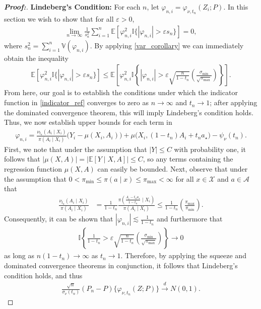 \documentclass[11pt,twoside]{article}
\theoremstyle{definition}
\theoremstyle{remark}
\begin{document}
\begin{proof}[\textbf{Proof:}]
\textbf{Lindeberg's Condition:} For each $n$, let $\varphi_{n,i} = \varphi_{\nu,t_n}(Z_i;P)$. In this section we wish to show that for all $\varepsilon > 0$,
    \begin{align*}
        \lim_{n\to\infty}\frac{1}{s_n^2}\sum_{i=1}^n\mathbb{E}\left[
        \varphi^2_{n, i}  \mathbb{I}\{|\varphi_{n, i}|>\varepsilon s_n\}
        \right] = 0,
    \end{align*}
where $s^2_n = \sum^n_{i=1} \mathbb{V}(\varphi_{n, i})$. By applying \cref{var_corollary} we can immediately obtain the inequality
\begin{align} \label{indicator_ref}
    \mathbb{E}\left[
    \varphi^2_{n, i} \mathbb{I}\{|\varphi_{n, i}|>\varepsilon s_n\}
    \right] \leq \mathbb{E}\left[
    \varphi^2_{n, i} \mathbb{I}\left\{ |\varphi_{n, i}|> \varepsilon \sqrt{\frac{n}{1 - t_n}}\left(\frac{\sigma_{\text{min}}}{\sqrt{\pi_{\max}}}\right)\right\} 
    \right].
\end{align}
From here, our goal is to establish the conditions under which the indicator function in \cref{indicator_ref} converges to zero as $n \to \infty$ and $t_n \to 1$; after applying the dominated convergence theorem, this will imply Lindeberg's condition holds. Thus, we now establish upper bounds for each term in
\begin{align*}
    \varphi_{n, i} =  \frac{\nu_{t_n}(A_i \mid X_i)}{\pi(A_i \mid X_i)}\big(Y_i - \mu(X_i, A_i) \big) +  \mu\big(X_i, (1 - t_n)A_i + t_n a_{\star}\big) - \psi_\nu(t_n).
\end{align*}
First, we note that under the assumption that $|Y| \leq C$ with probability one, it follows that $|\mu(X,A)|=|\mathbb{E}[Y\mid X,A]|\leq C$, so any terms containing the regression function $\mu(X, A)$ can easily be bounded. Next, observe that under the assumption that $0 < \pi_{\min} \leq \pi(a \! \mid \! x) \leq \pi_{\max} < \infty$ for all $x \in \mathcal{X}$ and $a \in \mathcal{A}$ that
\begin{align*}
    \frac{\nu_{t_n}(A_i \mid X_i)}{\pi(A_i \mid X_i)} &= \frac{1}{1-t_n} \frac{\pi(\frac{A_i - t_n a_{\star}}{1 - t_n} \mid X_i)}{\pi(A_i \mid X_i)} \leq \frac{1}{1-t_n} \left(\frac{\pi_{\max}}{\pi_{\min}} \right).
\end{align*}
Consequently, it can be shown that $| \varphi_{n, i}| \lesssim \frac{1}{1 - t_n}$ and furthermore that
\begin{align*}
    \mathbb{I}\left\{\frac{1}{1 - t_n} > \varepsilon \sqrt{\frac{n}{1 - t_n}}\left(\frac{\sigma_{\text{min}}}{\sqrt{\pi_{\max}}}\right)\right\} \to 0
\end{align*}
as long as $n(1-t_n) \to \infty$ as $t_n \to 1$. Therefore, by applying the squeeze and dominated convergence theorems in conjunction, it follows that Lindeberg's condition holds, and thus
\begin{align*}
    \frac{\sqrt{n}}{\sigma_{\nu}(t_n)} (P_n - P) \{ \varphi_{\nu, t_n}(Z; P) \} \overset{d}{\longrightarrow} N(0, 1).
\end{align*} \smallskip


\end{proof}
\end{document}
